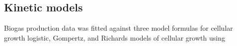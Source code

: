 \subsection{Kinetic models}
Biogas production data was fitted against three model formulas for cellular growth logistic, Gompertz, and
Richards models of cellular growth using  